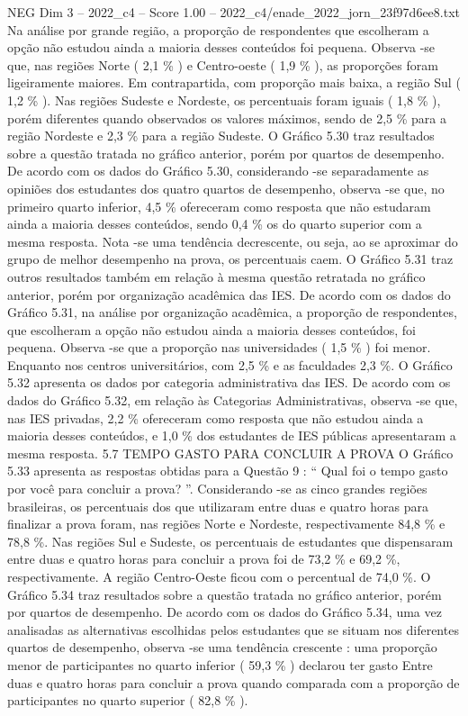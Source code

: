 \begin{textsample}{NEG Dim 3 – 2022\_c4 – Score 1.00 – 2022\_c4/enade\_2022\_jorn\_23f97d6ee8.txt}
Na análise por grande região, a proporção de respondentes que escolheram a opção não estudou ainda a maioria desses conteúdos foi pequena.
Observa -se que, nas regiões Norte ( 2,1 \% ) e Centro-oeste ( 1,9 \% ), as proporções foram ligeiramente maiores.
Em contrapartida, com proporção mais baixa, a região Sul ( 1,2 \% ).
Nas regiões Sudeste e Nordeste, os percentuais foram iguais ( 1,8 \% ), porém diferentes quando observados os valores máximos, sendo de 2,5 \% para a região Nordeste e 2,3 \% para a região Sudeste.
O Gráfico 5.30 traz resultados sobre a questão tratada no gráfico anterior, porém por quartos de desempenho.
De acordo com os dados do Gráfico 5.30, considerando -se separadamente as opiniões dos estudantes dos quatro quartos de desempenho, observa -se que, no primeiro quarto inferior, 4,5 \% ofereceram como resposta que não estudaram ainda a maioria desses conteúdos, sendo 0,4 \% os do quarto superior com a mesma resposta.
Nota -se uma tendência decrescente, ou seja, ao se aproximar do grupo de melhor desempenho na prova, os percentuais caem.
O Gráfico 5.31 traz outros resultados também em relação à mesma questão retratada no gráfico anterior, porém por organização acadêmica das IES.
De acordo com os dados do Gráfico 5.31, na análise por organização acadêmica, a proporção de respondentes, que escolheram a opção não estudou ainda a maioria desses conteúdos, foi pequena.
Observa -se que a proporção nas universidades ( 1,5 \% ) foi menor.
Enquanto nos centros universitários, com 2,5 \% e as faculdades 2,3 \%.
O Gráfico 5.32 apresenta os dados por categoria administrativa das IES.
De acordo com os dados do Gráfico 5.32, em relação às Categorias Administrativas, observa -se que, nas IES privadas, 2,2 \% ofereceram como resposta que não estudou ainda a maioria desses conteúdos, e 1,0 \% dos estudantes de IES públicas apresentaram a mesma resposta. 5.7 TEMPO GASTO PARA CONCLUIR A PROVA O Gráfico 5.33 apresenta as respostas obtidas para a Questão 9 : “ Qual foi o tempo gasto por você para concluir a prova? ”.
Considerando -se as cinco grandes regiões brasileiras, os percentuais dos que utilizaram entre duas e quatro horas para finalizar a prova foram, nas regiões Norte e Nordeste, respectivamente 84,8 \% e 78,8 \%.
Nas regiões Sul e Sudeste, os percentuais de estudantes que dispensaram entre duas e quatro horas para concluir a prova foi de 73,2 \% e 69,2 \%, respectivamente.
A região Centro-Oeste ficou com o percentual de 74,0 \%.
O Gráfico 5.34 traz resultados sobre a questão tratada no gráfico anterior, porém por quartos de desempenho.
De acordo com os dados do Gráfico 5.34, uma vez analisadas as alternativas escolhidas pelos estudantes que se situam nos diferentes quartos de desempenho, observa -se uma tendência crescente : uma proporção menor de participantes no quarto inferior ( 59,3 \% ) declarou ter gasto Entre duas e quatro horas para concluir a prova quando comparada com a proporção de participantes no quarto superior ( 82,8 \% ).

\end{textsample}
